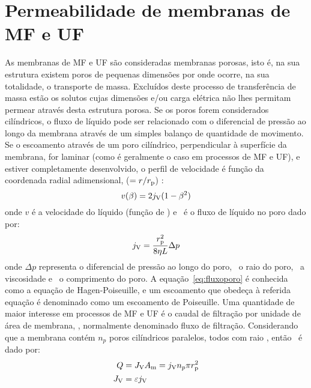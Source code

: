 \section{Permeabilidade de membranas de MF e UF} %
\label{sec:teo1}
As membranas de MF e UF são consideradas membranas porosas, isto é, na sua estrutura existem poros de pequenas dimensões por onde ocorre, na sua totalidade, o transporte de massa. Excluídos deste processo de transferência de massa estão os solutos cujas dimensões e/ou carga elétrica não lhes permitam permear através desta estrutura porosa. Se os poros forem considerados cilíndricos, o fluxo de líquido pode ser relacionado com o diferencial de pressão ao longo da membrana através de um simples balanço de quantidade de movimento. Se o escoamento através de um poro cilíndrico, perpendicular à superfície da membrana, for laminar (como é geralmente o caso em processos de MF e UF), e estiver completamente desenvolvido, o perfil de velocidade é função da coordenada radial adimensional, \radialadimensional ($=r/r_{\mathrm{p}}$) \cite{bird}:
\begin{equation}
 	\label{eq:bird}
 	v(\beta)=2j_{\mathrm{V}}(1-\beta^2)
 \end{equation}
onde $v$ é a velocidade do líquido (função de \radialadimensional) e \fluxoporo\ é o fluxo de líquido no poro dado por:
\begin{equation}
	\label{eq:fluxoporo}
	j_{\mathrm{V}}=\frac{r_{\mathrm{p}}^2}{8\eta L}\Delta p
\end{equation}
%
onde $\Delta p$ representa o diferencial de pressão ao longo do poro, \raioporo\ o raio do poro, \viscosidade\ a viscosidade e \comporo\ o comprimento do poro. A equação~\ref{eq:fluxoporo} é conhecida como a equação de Hagen-Poiseuille, e um escoamento que obedeça à referida equação é denominado como um escoamento de Poiseuille. 
Uma quantidade de maior interesse em processos de MF e UF é o caudal de filtração por unidade de área de membrana, \fluxo, normalmente denominado fluxo de filtração. Considerando que a membrana contém $n_p$ poros cilíndricos paralelos, todos com raio \raioporo, então \fluxo\ é dado por:
\begin{equation}
\begin{aligned}
	\label{eq:fluxopoise}
	Q &=J_{\mathrm{V}}A_{\mathrm{m}} = j_{\mathrm{V}} n_p\pi r_{\mathrm{p}}^2 \\
     J_{\mathrm{V}}&=\varepsilon j_{\mathrm{V}}
\end{aligned}
\end{equation}%
